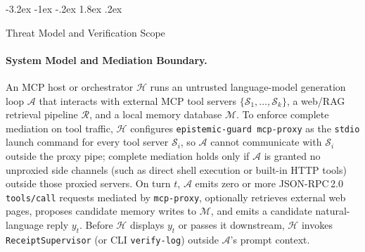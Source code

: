 \documentclass[10pt,twocolumn]{article}
\makeatletter
\renewcommand\section{\@startsection{section}{1}{\z@}%
  {-3.2ex \@plus -1ex \@minus -.2ex}%
  {1.8ex \@plus .2ex}%
  {\normalfont\Large\bfseries\raggedright}}
\makeatother
\begin{document}
\section{Threat Model and Verification Scope}
\label{sec:threat}

\paragraph{System Model and Mediation Boundary.}
An MCP host or orchestrator $\mathcal{H}$ runs an untrusted language-model generation loop $\mathcal{A}$ that interacts with external MCP tool servers $\{\mathcal{S}_1, \dots, \mathcal{S}_k\}$, a web/RAG retrieval pipeline $\mathcal{R}$, and a local memory database $\mathcal{M}$. To enforce complete mediation on tool traffic, $\mathcal{H}$ configures \texttt{epistemic-guard mcp-proxy} as the \texttt{stdio} launch command for every tool server $\mathcal{S}_i$, so $\mathcal{A}$ cannot communicate with $\mathcal{S}_i$ outside the proxy pipe; complete mediation holds only if $\mathcal{A}$ is granted no unproxied side channels (such as direct shell execution or built-in HTTP tools) outside those proxied servers. On turn $t$, $\mathcal{A}$ emits zero or more JSON-RPC\,2.0 \texttt{tools/call} requests mediated by \texttt{mcp-proxy}, optionally retrieves external web pages, proposes candidate memory writes to $\mathcal{M}$, and emits a candidate natural-language reply $y_t$. Before $\mathcal{H}$ displays $y_t$ or passes it downstream, $\mathcal{H}$ invokes \texttt{ReceiptSupervisor} (or CLI \texttt{verify-log}) outside $\mathcal{A}$'s prompt context.
\end{document}
